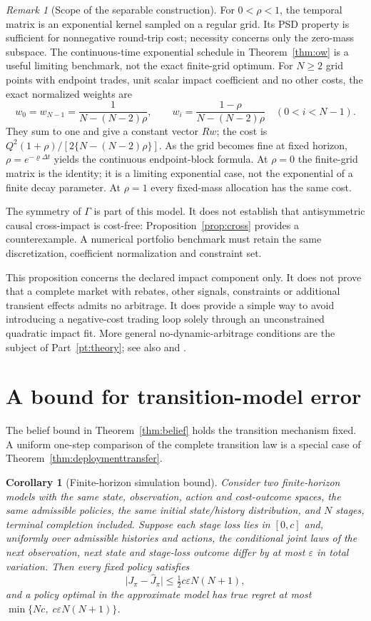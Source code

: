 \documentclass[11pt]{article}
\numberwithin{equation}{section}
\newtheorem{corollary}[theorem]{Corollary}
\theoremstyle{definition}
\theoremstyle{remark}
\newtheorem{remark}[theorem]{Remark}
\theoremstyle{definition}
\begin{document}
\begin{remark}[Scope of the separable construction]
For $0<\rho<1$, the temporal matrix is an exponential kernel sampled on a
regular grid. Its PSD property is sufficient for nonnegative round-trip cost;
necessity concerns only the zero-mass subspace. The continuous-time exponential
schedule in Theorem~\ref{thm:ow} is a useful limiting benchmark, not the exact
finite-grid optimum. For $N\geq2$ grid points with endpoint trades, unit scalar
impact coefficient and no other costs, the exact normalized weights are
\[
 w_0=w_{N-1}=\frac1{N-(N-2)\rho},\qquad
 w_i=\frac{1-\rho}{N-(N-2)\rho}\quad(0<i<N-1).
\]
They sum to one and give a constant vector $Rw$; the cost is
$Q^2(1+\rho)/[2\{N-(N-2)\rho\}]$. As the grid becomes fine at fixed horizon,
$\rho=e^{-\varrho\Delta t}$ yields the continuous endpoint-block formula.
At $\rho=0$ the finite-grid matrix is the identity; it is a limiting exponential
case, not the exponential of a finite decay parameter. At $\rho=1$ every
fixed-mass allocation has the same cost.

The symmetry of $\Gamma$ is part of this model. It does not establish that
antisymmetric causal cross-impact is cost-free: Proposition~\ref{prop:cross}
provides a counterexample. A numerical portfolio benchmark must retain the same
discretization, coefficient normalization and constraint set.
\end{remark}

This proposition concerns the declared impact component only. It does not
prove that a complete market with rebates, other signals, constraints or
additional transient effects admits no arbitrage. It does provide a simple
way to avoid introducing a negative-cost trading loop solely through an
unconstrained quadratic impact fit. More general no-dynamic-arbitrage
conditions are the subject of Part~\ref{pt:theory}; see also
\citet{gatheral2010} and \citet{schneider2019}.

\section{A bound for transition-model error}\label{app:modelerror}
The belief bound in Theorem~\ref{thm:belief} holds the transition mechanism fixed. A
uniform one-step comparison of the complete transition law is a special case of
Theorem~\ref{thm:deploymenttransfer}.

\begin{corollary}[Finite-horizon simulation bound]\label{prop:simulation}
Consider two finite-horizon models with the same state, observation, action
and cost-outcome spaces, the same admissible policies, the same initial
state/history distribution, and $N$ stages, terminal completion included.
Suppose each stage loss lies in $[0,c]$ and, uniformly over admissible
histories and actions, the conditional joint laws of the next observation,
next state and stage-loss outcome differ by at most $\varepsilon$ in total
variation. Then every fixed policy satisfies
\[
  \lvert J_\pi-\widehat J_\pi\rvert\le\tfrac12 c\varepsilon N(N+1),
\]
and a policy optimal in the approximate model has true regret at most
$\min\{Nc,\;c\varepsilon N(N+1)\}$.
\end{corollary}
\end{document}

